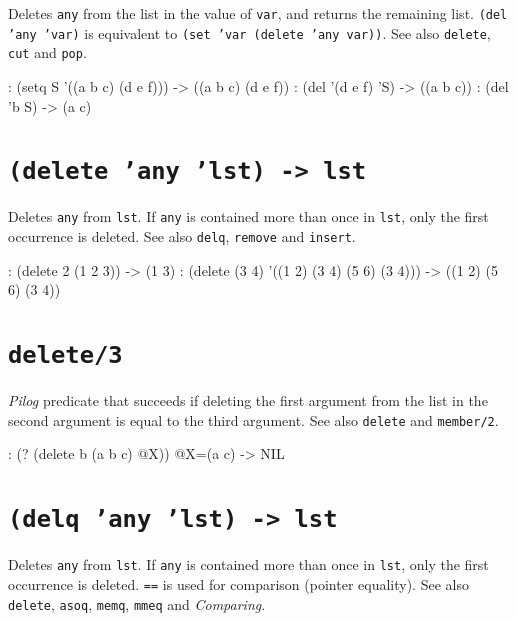 Deletes \texttt{any} from the list in the value of \texttt{var}, and returns the
remaining list. \texttt{(del 'any 'var)} is equivalent to
\texttt{(set 'var (delete 'any var))}. See also \texttt{delete}, \texttt{cut} and \texttt{pop}.


\begin{wideverbatim}
: (setq S '((a b c) (d e f)))
-> ((a b c) (d e f))
: (del '(d e f) 'S)
-> ((a b c))
: (del 'b S)
-> (a c)
\end{wideverbatim}

 
\section*{\texttt{(delete 'any 'lst) -> lst}}
\label{sec:func-ref-D-(delete 'any 'lst) -> lst}


Deletes \texttt{any} from \texttt{lst}. If \texttt{any} is contained more than once in \texttt{lst},
only the first occurrence is deleted. See also \texttt{delq}, \texttt{remove} and
\texttt{insert}.


\begin{wideverbatim}
: (delete 2 (1 2 3))
-> (1 3)
: (delete (3 4) '((1 2) (3 4) (5 6) (3 4)))
-> ((1 2) (5 6) (3 4))
\end{wideverbatim}

 
\section*{\texttt{delete/3}}
\label{sec:func-ref-D-delete/3}


\emph{Pilog} predicate that succeeds if deleting the first
argument from the list in the second argument is equal to the third
argument. See also \texttt{delete} and \texttt{member/2}.


\begin{wideverbatim}
: (? (delete b (a b c) @X))
 @X=(a c)
-> NIL
\end{wideverbatim}

 
\section*{\texttt{(delq 'any 'lst) -> lst}}
\label{sec:func-ref-D-(delq 'any 'lst) -> lst}


Deletes \texttt{any} from \texttt{lst}. If \texttt{any} is contained more than once in \texttt{lst},
only the first occurrence is deleted. \texttt{==} is used for comparison
(pointer equality). See also \texttt{delete}, \texttt{asoq}, \texttt{memq}, \texttt{mmeq} and
\emph{Comparing}.


